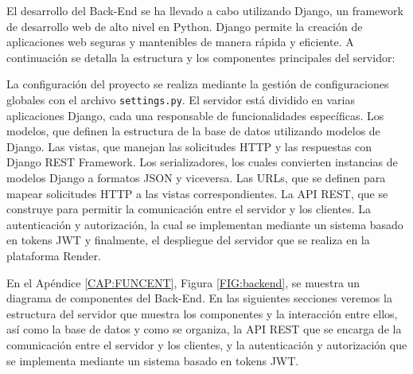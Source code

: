 El desarrollo del Back-End se ha llevado a cabo utilizando Django, un framework de desarrollo web de alto nivel en Python. Django permite la creación de aplicaciones web seguras y mantenibles de manera rápida y eficiente. A continuación se detalla la estructura y los componentes principales del servidor: 

La configuración del proyecto se realiza mediante la gestión de configuraciones globales con el archivo \texttt{settings.py}. El servidor está dividido en varias aplicaciones Django, cada una responsable de funcionalidades específicas. Los modelos, que definen la estructura de la base de datos utilizando modelos de Django. Las vistas, que manejan las solicitudes HTTP y las respuestas con Django REST Framework. Los serializadores, los cuales convierten instancias de modelos Django a formatos JSON y viceversa. Las URLs, que se definen para mapear solicitudes HTTP a las vistas correspondientes. La API REST, que se construye para permitir la comunicación entre el servidor y los clientes. La autenticación y autorización, la cual se implementan mediante un sistema basado en tokens JWT y finalmente, el despliegue del servidor que se realiza en la plataforma Render.

En el Apéndice \ref{CAP:FUNCENT}, Figura \ref{FIG:backend}, se muestra un diagrama de componentes del Back-End. En las siguientes secciones veremos la estructura del servidor que muestra los componentes y la interacción entre ellos, así como la base de datos y como se organiza, la API REST que se encarga de la comunicación entre el servidor y los clientes, y la autenticación y autorización que se implementa mediante un sistema basado en tokens JWT.
